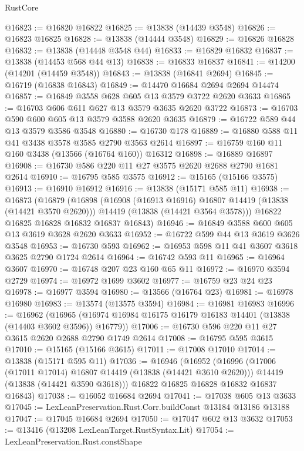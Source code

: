 \begin{lexlean}{RustCore}
\begin{coremodule}
@16823 := @16820 @16822
@16825 := @13838 (@14439 @3548)
@16826 := @16823 @16825
@16828 := @13838 (@14444 @3548)
@16829 := @16826 @16828
@16832 := @13838 (@14448 @3548 @44)
@16833 := @16829 @16832
@16837 := @13838 (@14453 @568 @44 @13)
@16838 := @16833 @16837
@16841 := @14200 (@14201 (@14459 @3548))
@16843 := @13838 (@16841 @2694)
@16845 := @16719 (@16838 @16843)
@16849 := @14470 @16684 @2694 @2694 @14474
@16857 := @16849 @3558 @628 @605 @13 @3579 @3722 @2620 @3633
@16865 := @16703 @606 @611 @627 @13 @3579 @3635 @2620 @3722
@16873 := @16703 @590 @600 @605 @13 @3579 @3588 @2620 @3635
@16879 := @16722 @589 @44 @13 @3579 @3586 @3548
@16880 := @16730 @178
@16889 := @16880 @588 @11 @41 @3438 @3578 @3585 @2790 @3563 @2614
@16897 := @16759 @160 @11 @160 @3438 (@13566 (@16764 @160)) @16312
@16898 := @16889 @16897
@16908 := @16730 @586 @220 @11 @27 @3575 @2620 @2688 @2790 @1681 @2614
@16910 := @16795 @585 @3575
@16912 := @15165 (@15166 @3575)
@16913 := @16910 @16912
@16916 := @13838 (@15171 @585 @11)
@16938 := @16873
    (@16879
      (@16898
        (@16908 (@16913 @16916) @16807 @14419 (@13838 (@14421 @3570 @2620)))
        @14419
        (@13838 (@14421 @3564 @3578)))
      @16822
      @16825
      @16828
      @16832
      @16837
      @16843)
@16946 := @16849 @3588 @600 @605 @13 @3619 @3628 @2620 @3633
@16952 := @16722 @599 @44 @13 @3619 @3626 @3548
@16953 := @16730 @593
@16962 := @16953 @598 @11 @41 @3607 @3618 @3625 @2790 @1724 @2614
@16964 := @16742 @593 @11
@16965 := @16964 @3607
@16970 := @16748 @207 @23 @160 @65 @11
@16972 := @16970 @3594 @2729
@16974 := @16972 @1699 @3602
@16977 := @16759 @23 @24 @23
@16978 := @16977 @3594
@16980 := @13566 (@16764 @23)
@16981 := @16978 @16980
@16983 := @13574 (@13575 @3594)
@16984 := @16981 @16983
@16996 := @16962
    (@16965 (@16974 @16984 @16175 @16179 @16183 @14401 (@13838 (@14403 @3602 @3596)) @16779))
@17006 := @16730 @596 @220 @11 @27 @3615 @2620 @2688 @2790 @1749 @2614
@17008 := @16795 @595 @3615
@17010 := @15165 (@15166 @3615)
@17011 := @17008 @17010
@17014 := @13838 (@15171 @595 @11)
@17036 := @16946
    (@16952
      (@16996
        (@17006 (@17011 @17014) @16807 @14419 (@13838 (@14421 @3610 @2620)))
        @14419
        (@13838 (@14421 @3590 @3618)))
      @16822
      @16825
      @16828
      @16832
      @16837
      @16843)
@17038 := @16052 @16684 @2694
@17041 := @17038 @605 @13 @3633
@17045 := LexLeanPreservation.Rust.Corr.buildConst @13184 @13186 @13188
@17047 := @17045 @16684 @2694
@17050 := @17047 @602 @13 @3632
@17053 := @13416 (@13208 LexLeanTarget.RustSyntax.Lit)
@17054 := LexLeanPreservation.Rust.constShape

\end{coremodule}
\end{lexlean}
